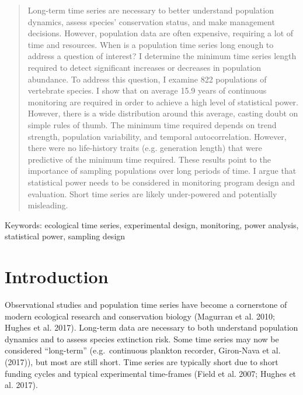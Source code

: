 \documentclass[12pt,]{article}
\begin{document}
\begin{abstract}
Long-term time series are necessary to better understand population dynamics, assess species' conservation status, and make management decisions. However, population data are often expensive, requiring a lot of time and resources. When is a population time series long enough to address a question of interest? I determine the minimum time series length required to detect significant increases or decreases in population abundance. To address this question, I examine 822 populations of vertebrate species. I show that on average 15.9 years of continuous monitoring are required in order to achieve a high level of statistical power. However, there is a wide distribution around this average, casting doubt on simple rules of thumb. The minimum time required depends on trend strength, population variability, and temporal autocorrelation. However, there were no life-history traits (e.g. generation length) that were predictive of the minimum time required. These results point to the importance of sampling populations over long periods of time. I argue that statistical power needs to be considered in monitoring program design and evaluation. Short time series are likely under-powered and potentially misleading.
\end{abstract}

Keywords: ecological time series, experimental design, monitoring, power
analysis, statistical power, sampling design

\section{Introduction}\label{introduction}

Observational studies and population time series have become a
cornerstone of modern ecological research and conservation biology
(Magurran et al. 2010; Hughes et al. 2017). Long-term data are necessary
to both understand population dynamics and to assess species extinction
risk. Some time series may now be considered ``long-term''
(e.g.~continuous plankton recorder, Giron-Nava et al. (2017)), but most
are still short. Time series are typically short due to short funding
cycles and typical experimental time-frames (Field et al. 2007; Hughes
et al. 2017).
\end{document}

